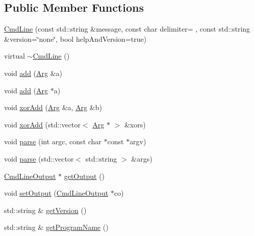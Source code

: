 \subsection*{Public Member Functions}
\begin{DoxyCompactItemize}
\item 
\hyperlink{class_t_c_l_a_p_1_1_cmd_line_a2e62a3493f8700afb49a7deb872a5b96}{Cmd\+Line} (const std\+::string \&message, const char delimiter= \textquotesingle{} \textquotesingle{}, const std\+::string \&version=\char`\"{}none\char`\"{}, bool help\+And\+Version=true)
\item 
virtual \hyperlink{class_t_c_l_a_p_1_1_cmd_line_a8a7bddba32c3d96e2a01e4c8e160e6fa}{$\sim$\+Cmd\+Line} ()
\item 
void \hyperlink{class_t_c_l_a_p_1_1_cmd_line_a94c511d4735ad9b8c97edaa3827f8bbf}{add} (\hyperlink{class_t_c_l_a_p_1_1_arg}{Arg} \&a)
\item 
void \hyperlink{class_t_c_l_a_p_1_1_cmd_line_ab8a08e8f4d3ca7709c85416f76e805a3}{add} (\hyperlink{class_t_c_l_a_p_1_1_arg}{Arg} $\ast$a)
\item 
void \hyperlink{class_t_c_l_a_p_1_1_cmd_line_afbaa2071d0c3276b383089acabdc0dd2}{xor\+Add} (\hyperlink{class_t_c_l_a_p_1_1_arg}{Arg} \&a, \hyperlink{class_t_c_l_a_p_1_1_arg}{Arg} \&b)
\item 
void \hyperlink{class_t_c_l_a_p_1_1_cmd_line_ac7f2d7ee32a5157f625ad9833ab148cf}{xor\+Add} (std\+::vector$<$ \hyperlink{class_t_c_l_a_p_1_1_arg}{Arg} $\ast$ $>$ \&xors)
\item 
void \hyperlink{class_t_c_l_a_p_1_1_cmd_line_acb07daf5a1370c176a7b4a6e4119fe6e}{parse} (int argc, const char $\ast$const $\ast$argv)
\item 
void \hyperlink{class_t_c_l_a_p_1_1_cmd_line_a712c3edf86aa0a8a28fb0b6d504d945a}{parse} (std\+::vector$<$ std\+::string $>$ \&args)
\item 
\hyperlink{class_t_c_l_a_p_1_1_cmd_line_output}{Cmd\+Line\+Output} $\ast$ \hyperlink{class_t_c_l_a_p_1_1_cmd_line_ad8aea2617edf53bbc20c8964ee5476e6}{get\+Output} ()
\item 
void \hyperlink{class_t_c_l_a_p_1_1_cmd_line_a4506e305cd10437c7ce5a5ba34cfed0f}{set\+Output} (\hyperlink{class_t_c_l_a_p_1_1_cmd_line_output}{Cmd\+Line\+Output} $\ast$co)
\item 
std\+::string \& \hyperlink{class_t_c_l_a_p_1_1_cmd_line_a85b5653d1a5b48fe6accead64615cf33}{get\+Version} ()
\item 
std\+::string \& \hyperlink{class_t_c_l_a_p_1_1_cmd_line_a47a6d496980ee11ffc42e27144a61797}{get\+Program\+Name} ()

\end{DoxyCompactItemize}
